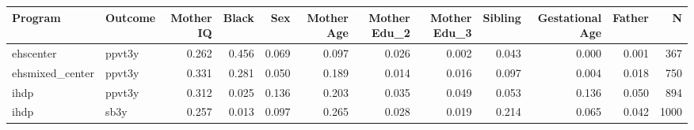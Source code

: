 \begin{table}[ht]
\centering
\begin{tabular}{llrrrrrrrrrr}
  \hline
Program & Outcome & Mother IQ & Black & Sex & Mother Age & Mother Edu\_2 & Mother Edu\_3 & Sibling & Gestational Age & Father & N \\ 
  \hline
ehscenter & ppvt3y & 0.262 & 0.456 & 0.069 & 0.097 & 0.026 & 0.002 & 0.043 & 0.000 & 0.001 & 367 \\ 
  ehsmixed\_center & ppvt3y & 0.331 & 0.281 & 0.050 & 0.189 & 0.014 & 0.016 & 0.097 & 0.004 & 0.018 & 750 \\ 
  ihdp & ppvt3y & 0.312 & 0.025 & 0.136 & 0.203 & 0.035 & 0.049 & 0.053 & 0.136 & 0.050 & 894 \\ 
  ihdp & sb3y & 0.257 & 0.013 & 0.097 & 0.265 & 0.028 & 0.019 & 0.214 & 0.065 & 0.042 & 1000 \\ 
   \hline
\end{tabular}
\end{table}
